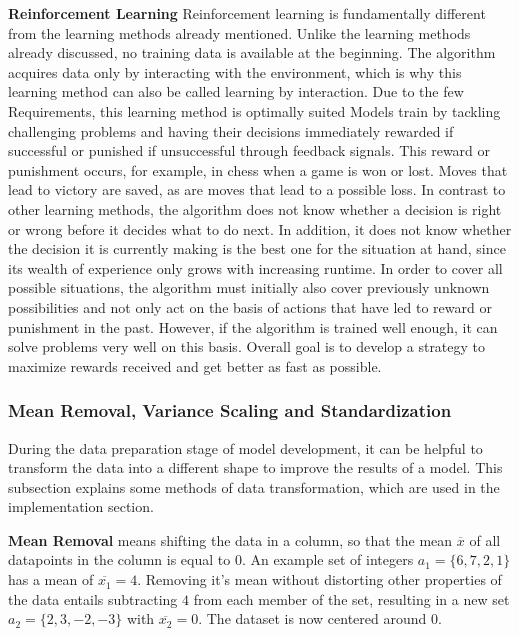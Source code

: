 \textbf{Reinforcement Learning}
Reinforcement learning is fundamentally different from the learning methods already mentioned.
Unlike the learning methods already discussed, no training data is available at the beginning.\cite[351]{Ertel2021}
The algorithm acquires data only by interacting with the environment,
which is why this learning method can also be called learning by interaction.
Due to the few Requirements, this learning method is optimally suited\cite[98]{schacht2019blockchain}
Models train by tackling challenging problems and having their decisions immediately rewarded
if successful or punished if unsuccessful through feedback signals.
This reward or punishment occurs, for example, in chess when a game is won or lost.
Moves that lead to victory are saved, as are moves that lead to a possible loss.\cite[98]{schacht2019blockchain}
In contrast to other learning methods, the algorithm does not know whether a decision is right or
wrong before it decides what to do next.
In addition, it does not know whether the decision it is currently making is the best one for the situation at hand,
since its wealth of experience only grows with increasing runtime. In order to cover all possible situations,
the algorithm must initially also cover previously unknown possibilities and not only act on the basis of actions
that have led to reward or punishment in the past.
However, if the algorithm is trained well enough, it can solve problems very well on this basis.
Overall goal is to develop a strategy to maximize rewards received and get better as fast as possible.\cite[351]{Ertel2021}


\subsubsection{Mean Removal, Variance Scaling and Standardization}
\label{sec:Mean Removal, Variance Scaling and Standardization}
During the data preparation stage of model development, it can be helpful to transform the data into a different shape
to improve the results of a model.\cite[35]{Subasi2020} This subsection explains some methods of data transformation, which are used in the
implementation section.

\textbf{Mean Removal} means shifting the data in a column, so that the mean $\overline{x}$ of all datapoints in the
column is equal to $0$.\cite{ScikitPreprocessing}
An example set of integers $a_1 = \{6, 7, 2, 1\}$ has a mean of $\overline{x_1} = 4$.
Removing it's mean without distorting other properties of the data entails subtracting $4$ from each member of the
set, resulting in a new set $a_2 = \{2, 3, -2, -3\}$ with $\overline{x_2} = 0$. The dataset is now centered around $0$.

